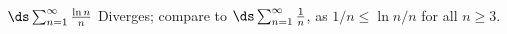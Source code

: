 {$\ds \sum_{n=1}^\infty \frac{\ln n}{n}$
}
{Diverges; compare to $\ds \sum_{n=1}^\infty \frac{1}{n}$, as $1/n \leq \ln n/n$ for all $n\geq 3$. 
}